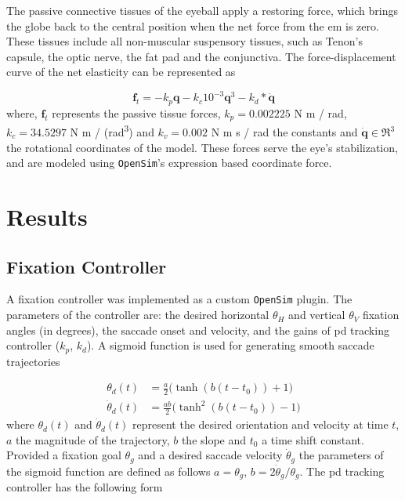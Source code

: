 \documentclass[11pt,a4paper,draft=false]{report}
\renewcommand*{\vec}[1]{\bm{#1}}
\newcommand{\R}[1]{\mathfrak{R}^{#1}}
\newcommand{\inr}[1]{\in\R{#1}}
\begin{document}
The passive connective tissues of the eyeball apply a restoring force, which
brings the globe back to the central position when the net force from the
\gls{em} is zero. These tissues include all non-muscular suspensory tissues,
such as Tenon’s capsule, the optic nerve, the fat pad and the conjunctiva. The
force-displacement curve of the net elasticity can be represented as

\begin{equation}\label{equ:passive-tissue}
  \vec{f}_t = -k_p \vec{q} - k_c 10^{-3} \vec{q}^3 - k_d * \vec{\dot{q}}
\end{equation}
% 
where, $\vec{f}_t$ represents the passive tissue forces, $k_p= 0.002225$ N m /
rad, $k_c= 34.5297$ N m / (rad\textsuperscript{3}) and $k_v= 0.002$ N m s / rad
the constants and $\vec{\dot{q}} \inr{3}$ the rotational coordinates of the
model. These forces serve the eye’s stabilization, and are modeled using
\texttt{OpenSim}'s expression based coordinate force.


\section*{Results}\label{sec:results}

\subsection*{Fixation Controller}\label{sec:fixation-controller}

A fixation controller was implemented as a custom \texttt{OpenSim} plugin. The
parameters of the controller are: the desired horizontal $\theta_H$ and vertical
$\theta_V$ fixation angles (in degrees), the saccade onset and velocity, and the
gains of \gls{pd} tracking controller ($k_p$, $k_d $). A sigmoid function is
used for generating smooth saccade trajectories

\begin{equation}\label{equ:sigmoid}
  \begin{aligned}
    \theta_d(t) &= \frac{a}{2} \Big(\tanh(b (t - t_0)) + 1\Big) \\
    \dot{\theta}_d(t) &= \frac{a b}{2} \Big(\tanh^2(b (t - t_0)) - 1\Big) 
  \end{aligned}
\end{equation}
%
where $\theta_d(t)$ and $\dot{\theta}_d(t)$ represent the desired orientation
and velocity at time $t$, $a$ the magnitude of the trajectory, $b$ the slope and
$t_0$ a time shift constant. Provided a fixation goal $\theta_g$ and a desired
saccade velocity $\dot{\theta}_g$ the parameters of the sigmoid function are
defined as follows $a = \theta_g$, $b = 2 \dot{\theta}_g / \theta_g$. The
\gls{pd} tracking controller has the following form
\end{document}
